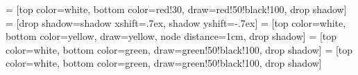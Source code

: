 \documentclass[a4paper,landscape]{article}
\begin{document}

\thispagestyle{empty}

\usetikzlibrary{positioning}
\usetikzlibrary{shadows}

 = [top color=white, bottom color=red!30, 
                            draw=red!50!black!100, drop shadow]
 = [drop shadow={shadow xshift=.7ex, 
                                 shadow yshift=-.7ex}]
 = [top color=white, bottom color=yellow, 
                               draw=yellow, node distance=1cm, drop shadow]
 = [top color=white, bottom color=green, 
                                  draw=green!50!black!100, drop shadow]
 = [top color=white, bottom color=green, 
                         draw=green!50!black!100, drop shadow]

\end{document}

